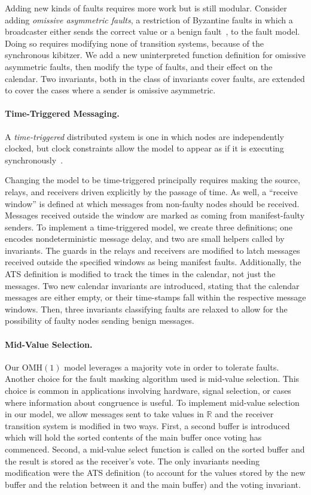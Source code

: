 \documentclass{llncs/llncs}
\newcommand{\OMH}{\ensuremath{\mathrm{OMH}}\xspace}
\begin{document}
{Adding new kinds of faults requires more work but is still modular. Consider adding \emph{omissive asymmetric faults}, a restriction of Byzantine faults in which a broadcaster either sends the correct value or a benign fault~\cite{omissive}, to the fault model. Doing so requires modifying none of transition systems, because of the synchronous kibitzer. We add a new uninterpreted function definition for omissive asymmetric faults, then modify the type of faults, and their effect on the calendar. Two invariants, both in the class of invariants cover faults, are extended to cover the cases where a sender is omissive asymmetric.

\paragraph{Time-Triggered Messaging.}
A \emph{time-triggered} distributed system is one in which nodes are independently clocked, but clock constraints allow the model to appear as if it is executing synchronously~\cite{kopetz}.

Changing the model to be time-triggered principally requires making the source, relays, and receivers driven explicitly by the passage of time. As well, a ``receive window'' is defined at which messages from non-faulty nodes should be received. Messages received outside the window are marked as coming from manifest-faulty senders. To implement a time-triggered model, we create three definitions; one encodes nondeterministic message delay, and two are small helpers called by invariants. The guards in the relays and receivers are modified to latch messages received outside the specified windows as being manifest faults. Additionally, the ATS definition is modified to track the times in the calendar, not just the messages. Two new calendar invariants are introduced, stating that the calendar messages are either empty, or their time-stamps fall within the respective message windows. Then, three invariants classifying faults are relaxed to allow for the possibility of faulty nodes sending benign messages.

\paragraph{Mid-Value Selection.}
Our $\OMH(1)$ model leverages a majority vote in order to tolerate faults. Another choice for the fault masking algorithm used is mid-value selection. This choice is common in applications involving hardware, signal selection, or cases where information about congruence is useful. To implement mid-value selection in our model, we allow messages sent to take values in $\mathbb{R}$ and the receiver transition system is modified in two ways. First, a second buffer is introduced which will hold the sorted contents of the main buffer once voting has commenced. Second, a mid-value select function is called on the sorted buffer and the result is stored as the receiver's vote. The only invariants needing modification were the ATS definition (to account for the values stored by the new buffer and the relation between it and the main buffer) and the voting invariant.


}
\end{document}

